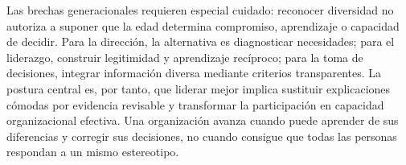 \documentclass[12pt,letterpaper,oneside]{article}
\begin{document}
Las brechas generacionales requieren especial cuidado: reconocer diversidad no autoriza a suponer que la edad determina compromiso, aprendizaje o capacidad de decidir. Para la dirección, la alternativa es diagnosticar necesidades; para el liderazgo, construir legitimidad y aprendizaje recíproco; para la toma de decisiones, integrar información diversa mediante criterios transparentes. La postura central es, por tanto, que liderar mejor implica sustituir explicaciones cómodas por evidencia revisable y transformar la participación en capacidad organizacional efectiva. Una organización avanza cuando puede aprender de sus diferencias y corregir sus decisiones, no cuando consigue que todas las personas respondan a un mismo estereotipo.

\label{fin-del-ensayo}
\clearpage
\printbibliography[title={Referencias}]
\end{document}

